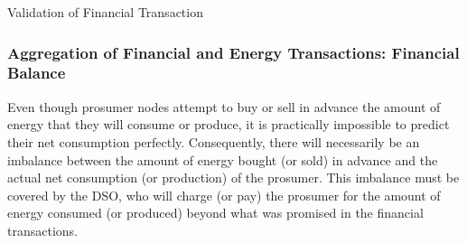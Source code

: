 \documentclass[sigconf]{acmart}
\begin{document}
\begin{algorithm}[h!]
\caption{Validation of Financial Transaction}
\label{alg:validateFinancialTransaction}
\begin{algorithmic}[1]
  \EndIf
  \EndIf
\EndFor
{}
  \EndIf
  \EndIf
\EndFor
{}
\Else
\EndIf
%
\end{algorithmic}
\end{algorithm}

\subsubsection{Aggregation of Financial and Energy Transactions: Financial Balance}

Even though prosumer nodes attempt to buy or sell in advance the amount of energy that they will consume or produce, it is practically impossible to predict their net consumption perfectly.
Consequently, there will necessarily be an imbalance between the amount of energy bought (or sold) in advance and the actual net consumption (or production) of the prosumer.
This imbalance must be covered by the DSO, who will charge (or pay) the prosumer for the amount of energy consumed (or produced) beyond what was promised in the financial transactions.
\end{document}
